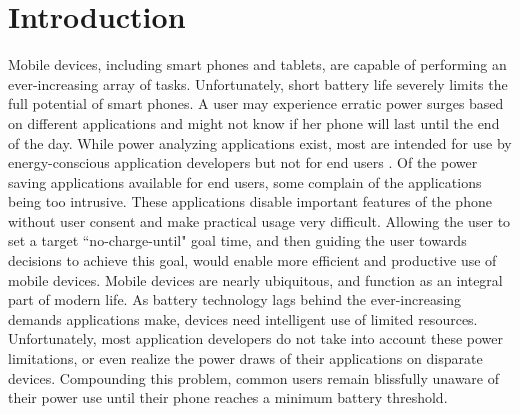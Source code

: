 \section*{Introduction}
\label{sec:intro}
Mobile devices, including smart phones and tablets, are capable of performing an ever-increasing array of tasks. 
Unfortunately, short battery life severely limits the full potential of smart phones. 
A user may experience erratic power surges based on different applications and might not know if her phone will last until the end of the day. 
While power analyzing applications exist, most are intended for use by energy-conscious application developers but not for end users \cite{Pathak:2012:ESI:2168836.2168841} \cite{energy-aware}. 
Of the power saving applications available for end users, some complain of the applications being too intrusive. 
These applications disable important features of the phone without user consent and make practical usage very difficult. 
Allowing the user to set a target ``no-charge-until" goal time, and then guiding the user towards decisions to achieve this goal, would enable more efficient and productive use of mobile devices.
Mobile devices are nearly ubiquitous, and function as an integral part of modern life. 
As battery technology lags behind the ever-increasing demands applications make, devices need intelligent use of limited resources. 
Unfortunately, most application developers do not take into account these power limitations, or even realize the power draws of their applications on disparate devices. 
Compounding this problem, common users remain blissfully unaware of their power use until their phone reaches a minimum battery threshold.

